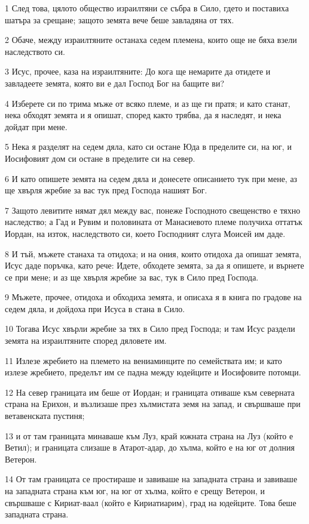 \par 1 След това, цялото общество израилтяни се събра в Сило, гдето и поставиха шатъра за срещане; защото земята вече беше завладяна от тях.
\par 2 Обаче, между израилтяните останаха седем племена, които още не бяха взели наследството си.
\par 3 Исус, прочее, каза на израилтяните: До кога ще немарите да отидете и завладеете земята, която ви е дал Господ Бог на бащите ви?
\par 4 Изберете си по трима мъже от всяко племе, и аз ще ги пратя; и като станат, нека обходят земята и я опишат, според както трябва, да я наследят, и нека дойдат при мене.
\par 5 Нека я разделят на седем дяла, като си остане Юда в пределите си, на юг, и Иосифовият дом си остане в пределите си на север.
\par 6 И като опишете земята на седем дяла и донесете описанието тук при мене, аз ще хвърля жребие за вас тук пред Господа нашият Бог.
\par 7 Защото левитите нямат дял между вас, понеже Господното свещенство е тяхно наследство; а Гад и Рувим и половината от Манасиевото племе получиха оттатък Иордан, на изток, наследството си, което Господният слуга Моисей им даде.
\par 8 И тъй, мъжете станаха та отидоха; и на ония, които отидоха да опишат земята, Исус даде поръчка, като рече: Идете, обходете земята, за да я опишете, и върнете се при мене; и аз ще хвърля жребие за вас, тук в Сило пред Господа.
\par 9 Мъжете, прочее, отидоха и обходиха земята, и описаха я в книга по градове на седем дяла, и дойдоха при Исуса в стана в Сило.
\par 10 Тогава Исус хвърли жребие за тях в Сило пред Господа; и там Исус раздели земята на израилтяните според дяловете им.
\par 11 Излезе жребието на племето на вениаминците по семействата им; и като излезе жребието, пределът им се падна между юдейците и Иосифовите потомци.
\par 12 На север границата им беше от Иордан; и границата отиваше към северната страна на Ерихон, и възлизаше през хълмистата земя на запад, и свършваше при ветавенската пустиня;
\par 13 и от там границата минаваше към Луз, край южната страна на Луз (който е Ветил); и границата слизаше в Атарот-адар, до хълма, който е на юг от долния Ветерон.
\par 14 От там границата се простираше и завиваше на западната страна и завиваше на западната страна към юг, на юг от хълма, който е срещу Ветерон, и свършваше с Кириат-ваал (който е Кириатиарим), град на юдейците. Това беше западната страна.
